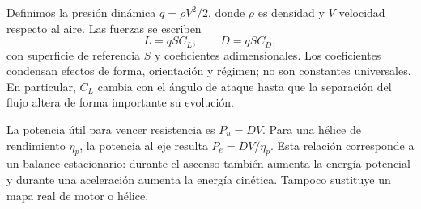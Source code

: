 Definimos la presión dinámica $q=\rho V^2/2$, donde $\rho$ es densidad y $V$ velocidad respecto al aire. Las fuerzas se escriben
\begin{equation}
 L=qSC_L,\qquad D=qSC_D,
\end{equation}
con superficie de referencia $S$ y coeficientes adimensionales. Los coeficientes condensan efectos de forma, orientación y régimen; no son constantes universales. En particular, $C_L$ cambia con el ángulo de ataque hasta que la separación del flujo altera de forma importante su evolución.

La potencia útil para vencer resistencia es $P_u=DV$. Para una hélice de rendimiento $\eta_p$, la potencia al eje resulta $P_e=DV/\eta_p$. Esta relación corresponde a un balance estacionario: durante el ascenso también aumenta la energía potencial y durante una aceleración aumenta la energía cinética. Tampoco sustituye un mapa real de motor o hélice.

